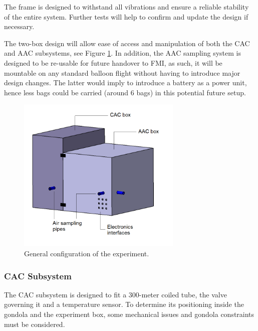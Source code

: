 The frame is designed to withstand all vibrations and ensure a reliable stability of the entire system. Further tests will help to confirm and update the design if necessary. 

The two-box design will allow ease of access and manipulation of both the CAC and AAC subsystems, see Figure \ref{overview}. In addition, the AAC sampling system is designed to be re-usable for future handover to FMI, as such, it will be mountable on any standard balloon flight without having to introduce major design changes. The latter would imply to introduce a battery as a power unit, hence less bags could be carried (around 6 bags) in this potential future setup.


\begin{figure}[!ht]
    \centering
    \includegraphics[width=0.7\textwidth]{4-experiment-design/img/overview_names.png}
    \caption{General configuration of the experiment.}
    \label{overview}
\end{figure}

\subsubsection{CAC Subsystem}

The CAC subsystem is designed to fit a 300-meter coiled tube, the valve governing it and a temperature sensor. To determine its positioning inside the gondola and the experiment box, some mechanical issues and gondola constraints must be considered.

